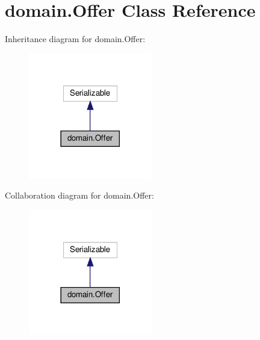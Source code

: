\hypertarget{classdomain_1_1_offer}{}\section{domain.\+Offer Class Reference}
\label{classdomain_1_1_offer}


Inheritance diagram for domain.\+Offer\+:
\nopagebreak
\begin{figure}[H]
\begin{center}
\leavevmode
\includegraphics[width=153pt]{classdomain_1_1_offer__inherit__graph}
\end{center}
\end{figure}


Collaboration diagram for domain.\+Offer\+:
\nopagebreak
\begin{figure}[H]
\begin{center}
\leavevmode
\includegraphics[width=153pt]{classdomain_1_1_offer__coll__graph}
\end{center}
\end{figure}
